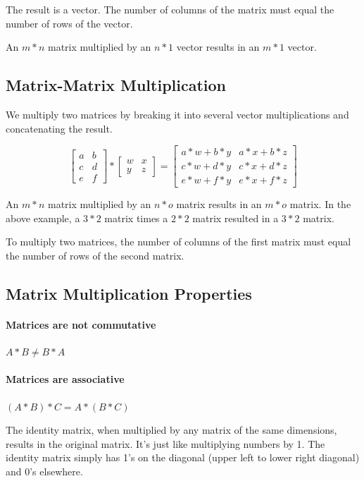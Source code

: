 \documentclass[UTF8]{article}
\begin{document}
The result is a vector. The number of columns of the matrix must equal the number of rows of the vector.

An $m * n$ matrix multiplied by an $n * 1$ vector results in an $m * 1$ vector.

\subsection{Matrix-Matrix Multiplication}

We multiply two matrices by breaking it into several vector multiplications and concatenating the result.

\[ \begin{bmatrix} a&b\\c&d\\e&f \end{bmatrix} * \begin{bmatrix} w&x\\y&z \end{bmatrix} = \begin{bmatrix} a*w + b*y & a*x + b*z \\ c*w + d*y & c*x + d*z \\ e*w + f*y & e*x + f*z \end{bmatrix}\]

An $m * n$ matrix multiplied by an $n * o$ matrix results in an $m * o$ matrix. In the above example, a $3 * 2$ matrix times a $2 * 2$ matrix resulted in a $3 * 2$ matrix.

To multiply two matrices, the number of columns of the first matrix must equal the number of rows of the second matrix.

\subsection{Matrix Multiplication Properties}

\paragraph{Matrices are not commutative} $A*B\ne B*A$

\paragraph{Matrices are associative} $(A*B)*C=A*(B*C)$

The identity matrix, when multiplied by any matrix of the same dimensions, results in the original matrix. It's just like multiplying numbers by 1. The identity matrix simply has 1's on the diagonal (upper left to lower right diagonal) and 0's elsewhere.
\end{document}
